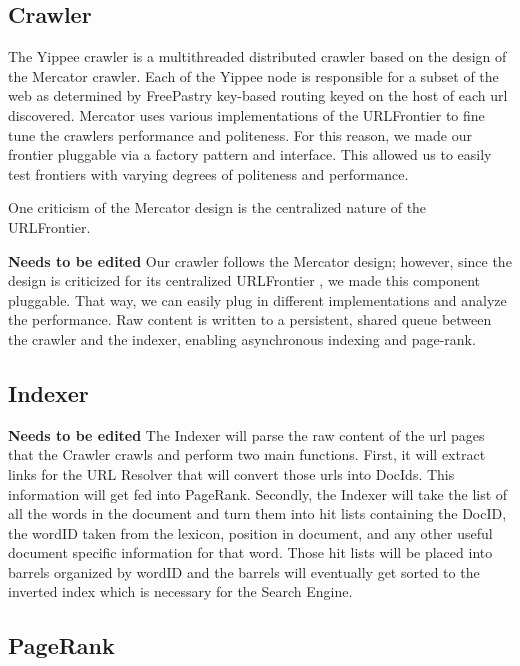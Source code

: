 \documentclass[11pt, letterpaper, oneside, twocolumn]{article}
\begin{document}
\subsection{Crawler}

The Yippee crawler is a multithreaded distributed crawler based on the design of the Mercator crawler\cite{mercator}. 
Each of the Yippee node is responsible for a subset of the web as determined by FreePastry key-based routing keyed on the host of each url discovered.
Mercator uses various implementations of the URLFrontier to fine tune the crawlers performance and politeness.
For this reason, we made our frontier pluggable via a factory pattern and interface.
This allowed us to easily test frontiers with varying degrees of politeness and performance.

One criticism of the Mercator design\cite{ubi,para} is the centralized nature of the URLFrontier. 

\textbf{Needs to be edited}
Our crawler follows the Mercator design; however, since the design is
criticized for its centralized URLFrontier , we made this
component pluggable. That  way, we can easily plug in different implementations 
and analyze the  performance. Raw content  is  written to a persistent, shared queue  
between the crawler and  the indexer, enabling
asynchronous indexing and page-rank.

\subsection{Indexer}

\textbf{Needs to be edited}
The Indexer will parse the raw content of the url pages that the Crawler crawls and perform two main functions.
First, it will extract links for the URL Resolver that will convert those urls into DocIds.
This information will get fed into PageRank.
Secondly, the Indexer will take the list of all the words in the document and turn them into hit lists containing the DocID, the wordID taken from the lexicon, position in document, and any other useful document specific information for that word. 
Those hit lists will be placed into barrels organized by wordID and the barrels will eventually get sorted to the inverted index which is necessary for the Search Engine.

\subsection{PageRank}
\end{document}
